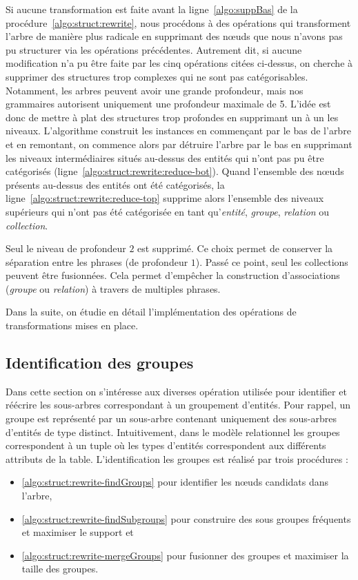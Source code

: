 Si aucune transformation est faite avant la ligne~\ref{algo:suppBas} de la procédure~\ref{algo:struct:rewrite},
nous procédons à des opérations qui transforment l'arbre de manière plus radicale en supprimant des nœuds que nous n'avons pas pu structurer via les opérations précédentes.
Autrement dit, si aucune modification n'a pu être faite par les cinq opérations citées ci-dessus, on cherche à supprimer des structures trop complexes qui ne sont pas catégorisables.
Notamment, les arbres peuvent avoir une grande profondeur, mais nos grammaires autorisent uniquement une profondeur maximale de 5.
L'idée est donc de mettre à plat des structures trop profondes en supprimant un à un les niveaux.
L'algorithme construit les instances en commençant par le bas de l'arbre et en remontant, on commence alors par détruire l'arbre par le bas en supprimant les niveaux intermédiaires situés au-dessus des entités qui n'ont pas pu être catégorisés (ligne~\ref{algo:struct:rewrite:reduce-bot}).
Quand l'ensemble des nœuds présents au-dessus des entités ont été catégorisés, la ligne~\ref{algo:struct:rewrite:reduce-top} supprime alors l'ensemble des niveaux supérieurs qui n'ont pas été catégorisée en tant qu'\emph{entité}, \emph{groupe}, \emph{relation} ou \emph{collection}.

\begin{remark}
    Seul le niveau de profondeur $2$ est supprimé.
    Ce choix permet de conserver la séparation entre les phrases (de profondeur $1$).
    Passé ce point, seul les collections peuvent être fusionnées.
    Cela permet d'empêcher la construction d'associations (\emph{groupe} ou \emph{relation}) à travers de multiples phrases.
\end{remark}

Dans la suite, on étudie en détail l'implémentation des opérations de transformations mises en place.

\FloatBarrier
\subsection{Identification des groupes}
Dans cette section on s'intéresse aux diverses opération utilisée pour identifier et réécrire les sous-arbres correspondant à un groupement d'entités.
Pour rappel, un groupe est représenté par un sous-arbre contenant uniquement des sous-arbres d'entités de type distinct.
Intuitivement, dans le modèle relationnel les groupes correspondent à un tuple où les types d'entités correspondent aux différents attributs de la table.
L'identification les groupes est réalisé par trois procédures :
\begin{itemize}
    \item \ref{algo:struct:rewrite-findGroups} pour identifier les nœuds candidats dans l'arbre,
    \item \ref{algo:struct:rewrite-findSubgroups} pour construire des sous groupes fréquents et maximiser le support et
    \item \ref{algo:struct:rewrite-mergeGroups} pour fusionner des groupes et maximiser la taille des groupes.
\end{itemize}

